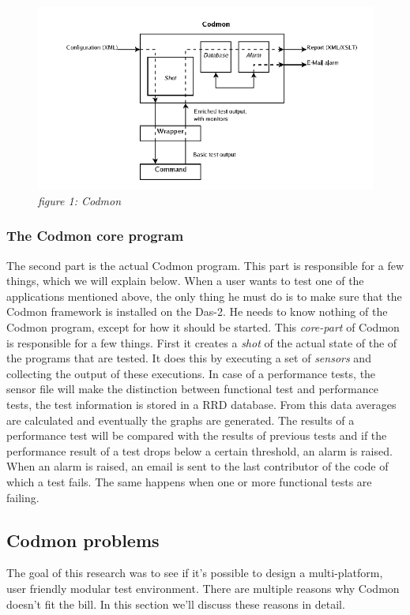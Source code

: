 \documentclass{article}
\begin{document}
\begin{figure}[!ht]
  \caption{\emph{figure 1: Codmon}}
  \centering
    \includegraphics[scale=0.5]{codmon}
\end{figure}

\subsubsection{The Codmon core program}
\label{coreprogram}
\noindent The second part is the actual Codmon program. This part is responsible for a few things, which we will explain below. When a user wants to test one of the applications mentioned above, the only 
thing he must do is to make sure that the Codmon framework is installed on the Das-2. He needs to know nothing of the Codmon program, except for how it should be started. This \emph{core-part} of 
Codmon is responsible for a few things. First it creates a \emph{shot} of the actual state of the of the programs that are tested. It does this by executing a set of \emph{sensors} and collecting the 
output of these executions. In case of a performance tests, the sensor file will make the distinction between functional test and performance tests, 
the test information is stored in a RRD database\cite{RRD}. From this data averages are calculated and eventually the graphs are generated\cite{Codmon}. The results of a performance test will be compared 
with the results of previous tests and if the performance result of a test drops below a certain threshold, an alarm is raised. When an alarm is raised, an email is sent to the last contributor of the code 
of which a test fails. The same happens when one or more functional tests are failing.\\
 


\subsection{Codmon problems}
\label{subsec:CodmonProblems}
The goal of this research was to see if it's possible to design a multi-platform, user friendly modular test environment. There are multiple reasons why Codmon doesn't fit the bill. In this section
we'll discuss these reasons in detail.
 
\end{document}
